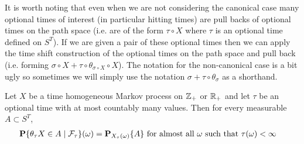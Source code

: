 It is worth noting that even when we are not considering the canonical
case many optional times of interest (in particular hitting times) are
pull backs of optional times on the path space (i.e. are of the form
$\tau \circ X$ where $\tau$ is an optional time defined on $S^T$).  If
we are given a pair of these optional times then we can
apply the time shift construction of the optional times on the path
space and pull back (i.e. forming $\sigma \circ X + \tau \circ
\theta_{\sigma \circ X} \circ X$).  The notation for the non-canonical
case is a bit ugly so sometimes we will simply use the notation $\sigma + \tau \circ
\theta_{\sigma} $ as a shorthand.

\begin{thm}\label{StrongMarkovPropertyMarkovProcessCountableValues}Let $X$ be a time homogeneous Markov process on
  $\integers_+$ or $\reals_+$ and let $\tau$ be an optional
  time with at most countably many values.  Then for every measurable
  $A \subset S^T$,
\begin{align*}
\cprobability{\mathcal{F}_\tau}{\theta_\tau X \in A}(\omega) &=
\sprobability{A}{X_\tau(\omega)} \text{ for almost all $\omega$ such that $\tau(\omega) < \infty$}
\end{align*}
\end{thm}
